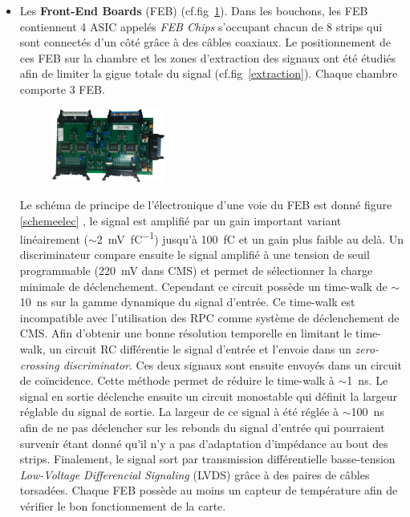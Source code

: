\begin{itemize}[label=$\bullet$]
	\item Les \textbf{Front-End Boards} (FEB) (cf.fig~\ref{Feb}). Dans les bouchons, les FEB contiennent \num{4} ASIC appelés \textit{FEB Chips} s'occupant chacun de \num{8} strips qui sont connectés d'un côté grâce à des câbles coaxiaux. Le positionnement de ces FEB sur la chambre et les zones d'extraction des signaux ont été étudiés afin de limiter la gigue totale du signal (cf.fig~\ref{extraction}). Chaque chambre comporte \num{3} FEB.
	
	\begin{figure}[ht!]
		\centering
		\includegraphics[width=0.35\textwidth]{RPC/Feb.png}
		\label{Feb}
	\end{figure}

	Le schéma de principe de l'électronique d'une voie du FEB est donné figure \ref{schemeelec} \cite{electro}, le signal est amplifié par un gain important variant linéairement ($\sim$\SI{2}{\milli\volt\per\femto\coulomb}) jusqu'à \SI{100}{\femto\coulomb} et un gain plus faible au delà. Un discriminateur compare ensuite le signal amplifié à une tension de seuil programmable (\SI{220}{\milli\volt} dans CMS) et permet de sélectionner la charge minimale de déclenchement. Cependant ce circuit possède un time-walk de $\sim$\SI{10}{\nano\second} sur la gamme dynamique du signal d'entrée. Ce time-walk est incompatible avec l'utilisation des RPC comme système de déclenchement de CMS. Afin d'obtenir une bonne résolution temporelle en limitant le time-walk, un circuit RC différentie le signal d'entrée et l'envoie dans un \textit{zero-crossing discriminator}. Ces deux signaux sont ensuite envoyés dans un circuit de coïncidence. Cette méthode permet de réduire le time-walk à $\sim$\SI{1}{\nano\second}. Le signal en sortie déclenche ensuite un circuit monostable qui définit la largeur réglable du signal de sortie. La largeur de ce signal à été réglée à $\sim$\SI{100}{\nano\second} afin de ne pas déclencher sur les rebonds du signal d'entrée qui pourraient survenir étant donné qu'il n'y a pas d'adaptation d'impédance au bout des strips. Finalement, le signal sort par transmission différentielle basse-tension \textit{Low-Voltage Differencial Signaling} (LVDS) grâce à des paires de câbles torsadées. Chaque FEB possède au moins un capteur de température afin de vérifier le bon fonctionnement de la carte.
	

\end{itemize}

